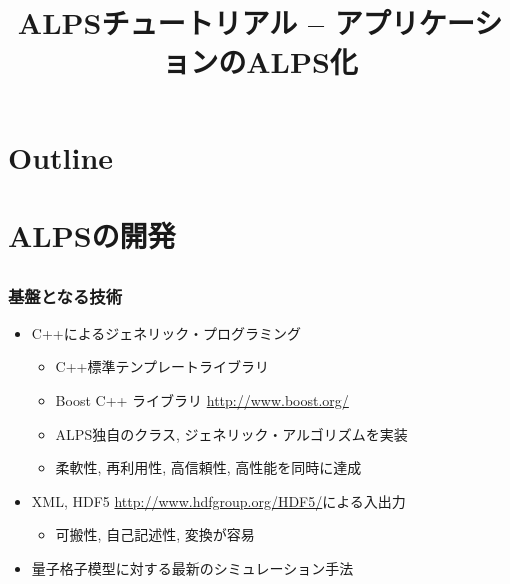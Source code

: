 \title{ALPSチュートリアル -- アプリケーションのALPS化}




\begin{frame}
  \titlepage
\end{frame}

\section*{Outline}
\begin{frame}
  \tableofcontents
\end{frame}

\section{ALPSの開発}
\subsection*{\redm\whitem\greenb}

\begin{frame}
  \frametitle{基盤となる技術}
  \begin{itemize}
    \setlength{\itemsep}{1em}
  \item C++によるジェネリック・プログラミング
    \begin{itemize}
    \item C++標準テンプレートライブラリ
    \item Boost C++ ライブラリ \url{http://www.boost.org/}
    \item ALPS独自のクラス, ジェネリック・アルゴリズムを実装
    \item 柔軟性, 再利用性, 高信頼性, 高性能を同時に達成
    \end{itemize}
  \item XML, HDF5 \url{http://www.hdfgroup.org/HDF5/}による入出力
    \begin{itemize}
    \item 可搬性, 自己記述性, 変換が容易
    \end{itemize}
  \item 量子格子模型に対する最新のシミュレーション手法
  \end{itemize}
\end{frame}

